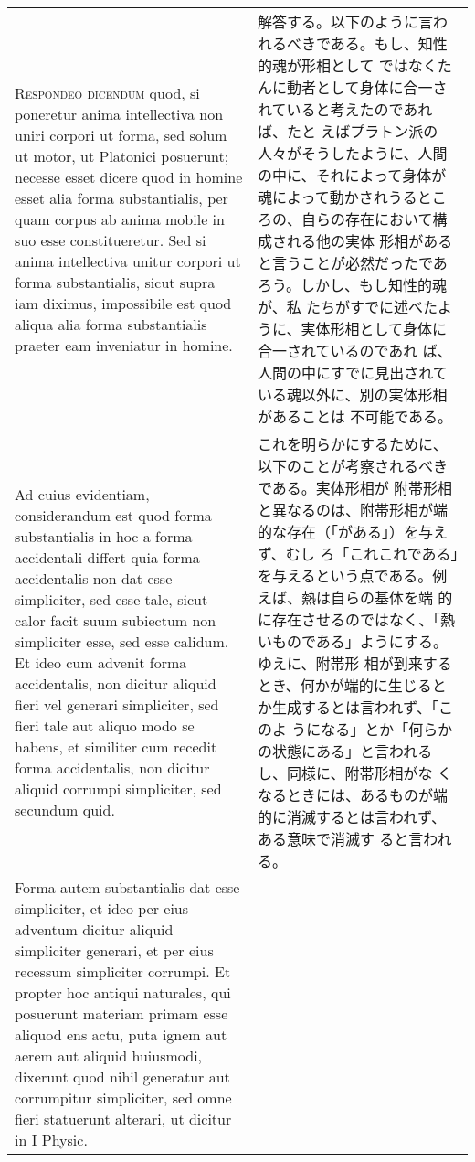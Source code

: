 \documentclass[paper=a4paper,fontsize=10pt,jafontsize=9pt,titlepage]{jlreq}
\begin{document}
\begin{longtable}{p{21em}p{21em}}
{\scshape Respondeo dicendum} quod, si poneretur anima intellectiva
non uniri corpori ut forma, sed solum ut motor, ut Platonici
posuerunt; necesse esset dicere quod in homine esset alia forma
substantialis, per quam corpus ab anima mobile in suo esse
constitueretur. Sed si anima intellectiva unitur corpori ut forma
substantialis, sicut supra iam diximus, impossibile est quod aliqua
 alia forma substantialis praeter eam inveniatur in homine.

 &

 解答する。以下のように言われるべきである。もし、知性的魂が形相として
 ではなくたんに動者として身体に合一されていると考えたのであれば、たと
 えばプラトン派の人々がそうしたように、人間の中に、それによって身体が
 魂によって動かされうるところの、自らの存在において構成される他の実体
 形相があると言うことが必然だったであろう。しかし、もし知性的魂が、私
 たちがすでに述べたように、実体形相として身体に合一されているのであれ
 ば、人間の中にすでに見出されている魂以外に、別の実体形相があることは
 不可能である。
 
 
\\

Ad cuius evidentiam, considerandum est quod forma substantialis in hoc
a forma accidentali differt quia forma accidentalis non dat esse
simpliciter, sed esse tale, sicut calor facit suum subiectum non
simpliciter esse, sed esse calidum. Et ideo cum advenit forma
accidentalis, non dicitur aliquid fieri vel generari simpliciter, sed
fieri tale aut aliquo modo se habens, et similiter cum recedit forma
accidentalis, non dicitur aliquid corrumpi simpliciter, sed secundum
quid.

&

これを明らかにするために、以下のことが考察されるべきである。実体形相が
附帯形相と異なるのは、附帯形相が端的な存在（「がある」）を与えず、むし
ろ「これこれである」を与えるという点である。例えば、熱は自らの基体を端
的に存在させるのではなく、「熱いものである」ようにする。ゆえに、附帯形
相が到来するとき、何かが端的に生じるとか生成するとは言われず、「このよ
うになる」とか「何らかの状態にある」と言われるし、同様に、附帯形相がな
くなるときには、あるものが端的に消滅するとは言われず、ある意味で消滅す
ると言われる。
 
\\

Forma autem substantialis dat esse simpliciter, et ideo per eius
adventum dicitur aliquid simpliciter generari, et per eius recessum
simpliciter corrumpi. Et propter hoc antiqui naturales, qui posuerunt
materiam primam esse aliquod ens actu, puta ignem aut aerem aut
aliquid huiusmodi, dixerunt quod nihil generatur aut corrumpitur
simpliciter, sed omne fieri statuerunt alterari, ut dicitur in I
Physic.


\end{longtable}
\end{document}
